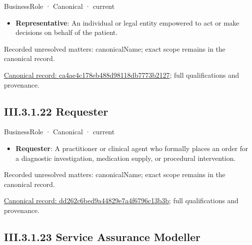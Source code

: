 \label{element:ca4ae4c178eb488d98118db7773b2127}
{\small BusinessRole · Canonical · current}\par

\begin{itemize}


\item \textbf{Representative}: An individual or legal entity empowered to act or make decisions on behalf of the patient.

\end{itemize}

{\small Recorded unresolved matters: canonicalName; exact scope remains in the canonical record.}\par
{\footnotesize \href{../../../../continuum/business/business-role/ca4ae4c178eb488d98118db7773b2127.md}{Canonical record: ca4ae4c178eb488d98118db7773b2127}; full qualifications and provenance.}\par
\subsection*{III.3.1.22 Requester}
\label{navigation:III.3.1.22}

\label{element:dd262c6bed9a44829e7a4f6796c13b3b}
{\small BusinessRole · Canonical · current}\par

\begin{itemize}


\item \textbf{Requester}: A practitioner or clinical agent who formally places an order for a diagnostic investigation, medication supply, or procedural intervention.

\end{itemize}

{\small Recorded unresolved matters: canonicalName; exact scope remains in the canonical record.}\par
{\footnotesize \href{../../../../continuum/business/business-role/dd262c6bed9a44829e7a4f6796c13b3b.md}{Canonical record: dd262c6bed9a44829e7a4f6796c13b3b}; full qualifications and provenance.}\par
\subsection*{III.3.1.23 Service Assurance Modeller}
\label{navigation:III.3.1.23}

